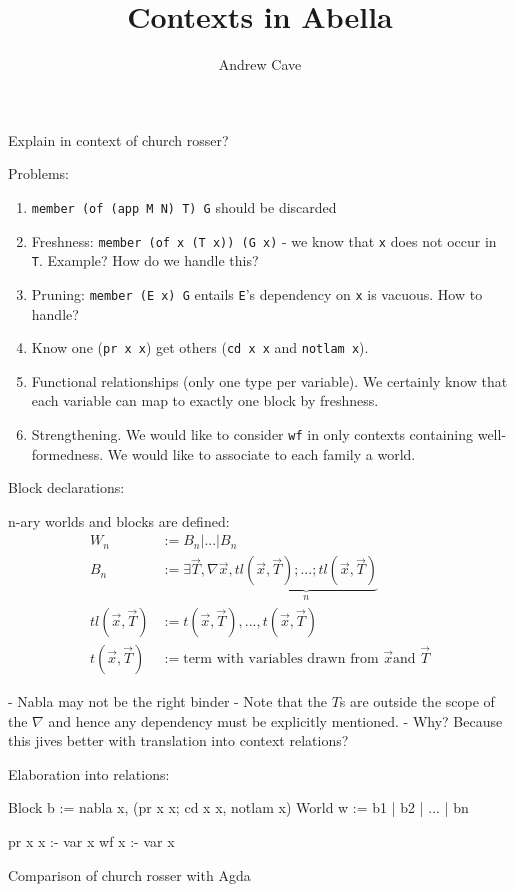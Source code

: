 \documentclass{article}
\title{Contexts in Abella}
\author{Andrew Cave}
\begin{document}
\maketitle
Explain in context of church rosser?

Problems:
\begin{enumerate}
\item {\tt member (of (app M N) T) G} should be discarded
\item Freshness: {\tt member (of x (T x)) (G x)} - we know that  {\tt x}
  does not occur in {\tt T}. Example? How do we handle this? 
\item Pruning: {\tt member (E x) G} entails {\tt E}'s dependency on
  {\tt x} is vacuous. How to handle?
\item Know one ({\tt pr x x}) get others ({\tt cd x x} and {\tt notlam x}).
\item Functional relationships (only one type per variable). We
  certainly know that each variable can map to exactly one block by
  freshness.
\item Strengthening. We would like to consider {\tt wf} in only
  contexts containing well-formedness. We would like to associate to
  each family a world.
\end{enumerate}

Block declarations:

n-ary worlds and blocks are defined: 
\begin{align*}
W_n &:= B_n | ... | B_n \\
B_n &:= \exists \vec{T}, \nabla \vec{x}, \underbrace{tl(\vec{x}, \vec{T}); ...;
tl(\vec{x}, \vec{T})}_{n} \\
tl(\vec{x}, \vec{T}) &:= t(\vec{x}, \vec{T}), ..., t(\vec{x}, \vec{T}) \\
t(\vec{x}, \vec{T}) &:= \text{term with variables drawn from } \vec{x} \text{
  and } \vec{T}
\end{align*}

- Nabla may not be the right binder
- Note that the $T$s are outside the scope of the $\nabla$ and hence
any dependency must be explicitly mentioned.
- Why? Because this jives better with translation into context
relations? 

Elaboration into relations:

Block b := nabla x, (pr x x; cd x x, notlam x)
World w := b1 | b2 | ... | bn

pr x x :- var x
wf x :- var x

Comparison of church rosser with Agda
\end{document}
